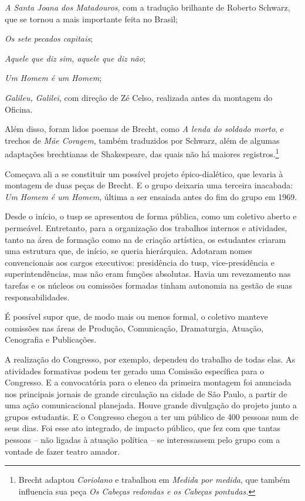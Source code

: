 \startitemize[packed]
\item{\it A Santa Joana dos Matadouros}, com a tradução brilhante de Roberto
Schwarz, que se tornou a mais importante feita no Brasil;

\item{\it Os sete pecados capitais};

\item{\it Aquele que diz sim, aquele que diz não};

\item{\it Um Homem é um Homem};

\item{\it Galileu, Galilei}, com direção de Zé Celso, realizada antes da
montagem do Oficina.
\stopitemize

Além disso, foram lidos poemas de Brecht, como {\it A lenda do
soldado morto}, e trechos de {\it Mãe Coragem}, também traduzidos por
Schwarz, além de algumas adaptações brechtianas de Shakespeare, das
quais não há maiores registros.\footnote{Brecht adaptou {\it Coriolano}
  e trabalhou em {\it Medida por medida}, que também influencia sua peça
  {\it Os Cabeças redondas e os Cabeças pontudas.}}

Começava ali a se constituir um possível projeto épico-dialético, que
levaria à montagem de duas peças de Brecht. E o grupo deixaria uma
terceira inacabada: {\it Um Homem é um Homem}, última a ser ensaiada
antes do fim do grupo em 1969.

\subject{Organização do trabalho: comissões internas}

Desde o início, o {\sc tusp} se apresentou de forma pública, como um coletivo
aberto e permeável. Entretanto, para a organização dos trabalhos
internos e atividades, tanto na área de formação como na de criação
artística, os estudantes criaram uma estrutura que, de início, se queria
hierárquica. Adotaram nomes convencionais aos cargos executivos:
presidência do {\sc tusp}, vice-presidência e superintendências, mas
não eram funções absolutas. Havia um revezamento nas tarefas e os
núcleos ou comissões formadas tinham autonomia na gestão de suas
responsabilidades.

É possível supor que, de modo mais ou menos formal, o coletivo manteve
comissões nas áreas de Produção, Comunicação, Dramaturgia, Atuação,
Cenografia e Publicações.

A realização do Congresso, por exemplo, dependeu do trabalho de todas
elas. As atividades formativas podem ter gerado uma Comissão específica
para o Congresso. E a convocatória para o elenco da primeira montagem
foi anunciada nos principais jornais de grande circulação na cidade de
São Paulo, a partir de uma ação comunicacional planejada. Houve grande
divulgação do projeto junto a grupos estudantis. E o Congresso chegou a
ter um público de 400 pessoas num de seus dias. Foi esse ato integrado,
de impacto público, que fez com que tantas pessoas -- não ligadas à
atuação política -- se interessassem pelo grupo com a vontade de fazer
teatro amador.

